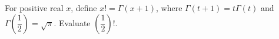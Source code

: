 For positive real $x$, define $x!=\Gamma(x+1)$, where $\Gamma(t+1)=t\Gamma(t)$ and $\Gamma\left(\dfrac{1}{2}\right)=\sqrt\pi$. Evaluate $\left(\dfrac{1}{2}\right)!$.

